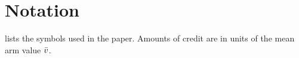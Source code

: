 


\section{Notation}
\label{app:notation}

 lists the symbols used in the paper. Amounts of credit are in units of the mean arm value $\bar v$.

